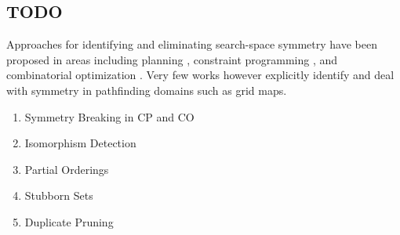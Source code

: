 \subsection{TODO}
Approaches for identifying and eliminating search-space symmetry have been
proposed in areas including planning \cite{fox99}, constraint programming
\cite{gent00}, and combinatorial optimization \cite{fukunaga08}. 
Very few works however explicitly identify and deal with symmetry in pathfinding
domains such as grid maps. 

\begin{enumerate}
\item{Symmetry Breaking in CP and CO}
\item{Isomorphism Detection}
\item{Partial Orderings}
\item{Stubborn Sets}
\item{Duplicate Pruning}
\end{enumerate}

